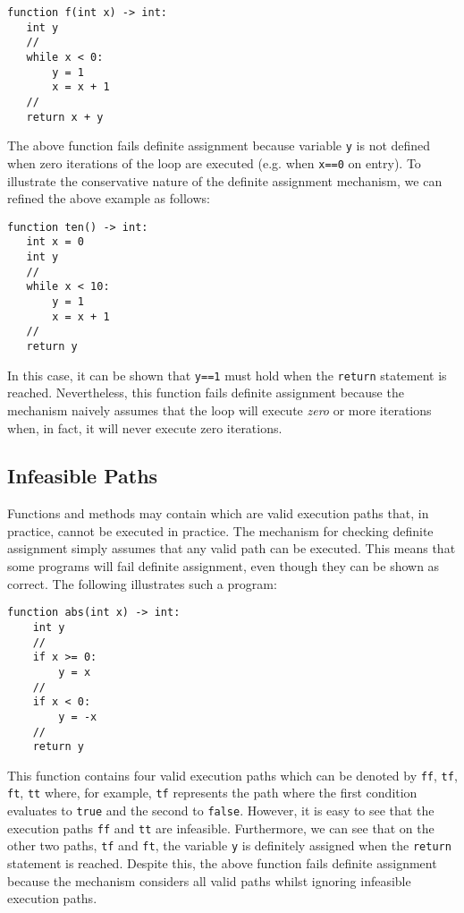 \begin{lstlisting}
function f(int x) -> int:
   int y
   //
   while x < 0:
       y = 1
       x = x + 1
   //
   return x + y
\end{lstlisting}

The above function fails definite assignment because variable \lstinline{y} is not defined when zero iterations of the loop are executed (e.g. when \lstinline{x==0} on entry).  To illustrate the conservative nature of the definite assignment mechanism, we can refined the above example as follows:

\begin{lstlisting}
function ten() -> int:
   int x = 0
   int y
   //
   while x < 10:
       y = 1
       x = x + 1
   //
   return y
\end{lstlisting}

In this case, it can be shown that \lstinline{y==1} must hold when the \lstinline{return} statement is reached.  Nevertheless, this function fails definite assignment because the mechanism naively assumes that the loop will execute {\em zero} or more iterations when, in fact, it will never execute zero iterations.

\subsection{Infeasible Paths}

Functions and methods may contain  which are valid execution paths that, in practice, cannot be executed in practice.  The mechanism for checking definite assignment simply assumes that any valid path can be executed.  This means that some programs will fail definite assignment, even though they can be shown as correct.   The following illustrates such a program:

\begin{lstlisting}
function abs(int x) -> int:
    int y
    //
    if x >= 0:
        y = x
    //
    if x < 0:
        y = -x
    //
    return y
\end{lstlisting}

This function contains four valid execution paths which can be denoted by \lstinline{ff}, \lstinline{tf}, \lstinline{ft}, \lstinline{tt} where, for example, \lstinline{tf} represents the path where the first condition evaluates to \lstinline{true} and the second to \lstinline{false}.  However, it is easy to see that the execution paths \lstinline{ff} and \lstinline{tt} are infeasible.  Furthermore, we can see that on the other two paths, \lstinline{tf} and \lstinline{ft}, the variable \lstinline{y} is definitely assigned when the \lstinline{return} statement is reached.  Despite this, the above function fails definite assignment because the mechanism considers all valid paths whilst ignoring infeasible execution paths.

